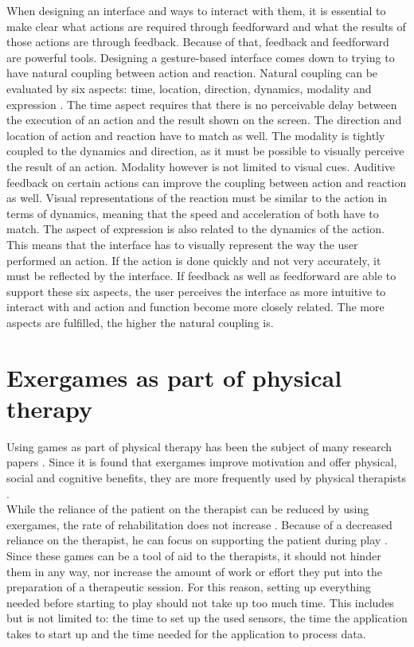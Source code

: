 When designing an interface and ways to interact with them, it is essential to make clear what actions are required through feedforward and what the results of those actions are through feedback. Because of that, feedback and feedforward are powerful tools. Designing a gesture-based interface comes down to trying to have natural coupling between action and reaction. Natural coupling can be evaluated by six aspects: time, location, direction, dynamics, modality and expression \cite{Wensveen2004}. The time aspect requires that there is no perceivable delay between the execution of an action and the result shown on the screen. The direction and location of action and reaction have to match as well. The modality is tightly coupled to the dynamics and direction, as it must be possible to visually perceive the result of an action. Modality however is not limited to visual cues. Auditive feedback on certain actions can improve the coupling between action and reaction as well. Visual representations of the reaction must be similar to the action in terms of dynamics, meaning that the speed and acceleration of both have to match. The aspect of expression is also related to the dynamics of the action. This means that the interface has to visually represent the way the user performed an action. If the action is done quickly and not very accurately, it must be reflected by the interface. If feedback as well as feedforward are able to support these six aspects, the user perceives the interface as more intuitive to interact with and action and function become more closely related. The more aspects are fulfilled, the higher the natural coupling is. \cite{Wensveen2004}


\section{Exergames as part of physical therapy}

Using games as part of physical therapy has been the subject of many research papers \cite{Geurts2011}\cite{Hondori2014}\cite{Lange2012}\cite{Chang2011}\cite{Verbouw2016}. Since it is found that exergames improve motivation \cite{Brauner2013} and offer physical, social and cognitive benefits, they are more frequently used by physical therapists \cite{Peng2011}\cite{Staiano2011}.\\

While the reliance of the patient on the therapist can be reduced by using exergames, the rate of rehabilitation does not increase \cite{Dahl2014}. Because of a decreased reliance on the therapist, he can focus on supporting the patient during play \cite{Annema2013}. Since these games can be a tool of aid to the therapists, it should not hinder them in any way, nor increase the amount of work or effort they put into the preparation of a therapeutic session. For this reason, setting up everything needed before starting to play should not take up too much time. This includes but is not limited to: the time to set up the used sensors, the time the application takes to start up and the time needed for the application to process data.\\

